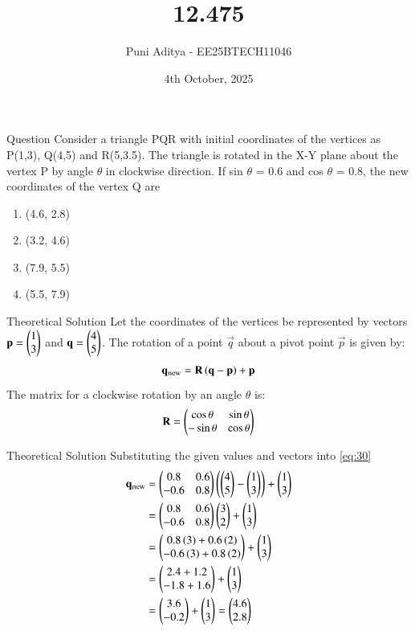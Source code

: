 \documentclass{beamer}
\title{12.475}
\date{4th October, 2025}
\author{Puni Aditya - EE25BTECH11046}
\begin{document}
\frame{\titlepage}
\begin{frame}{Question}
Consider a triangle PQR with initial coordinates of the vertices as P(1,3), Q(4,5) and R(5,3.5). The triangle is rotated in the X-Y plane about the vertex P by angle $\theta$ in clockwise direction. If sin $\theta$ = 0.6 and cos $\theta$ = 0.8, the new coordinates of the vertex Q are
\begin{enumerate}
    \item (4.6, 2.8)
    \item (3.2, 4.6)
    \item (7.9, 5.5)
    \item (5.5, 7.9)
\end{enumerate}
\end{frame}

\begin{frame}{Theoretical Solution}
Let the coordinates of the vertices be represented by vectors $\mathbf{p} = \begin{pmatrix}1 \\ 3\end{pmatrix}$ and $\mathbf{q} = \begin{pmatrix}4 \\ 5\end{pmatrix}$.
The rotation of a point $\vec{q}$ about a pivot point $\vec{p}$ is given by:
\begin{align}
    \mathbf{q}_{\text{new}} = \mathbf{R}\left(\mathbf{q} - \mathbf{p}\right) + \mathbf{p} \label{eq:30}
\end{align}
The matrix for a clockwise rotation by an angle $\theta$ is:
\begin{align}
    \mathbf{R} = \begin{pmatrix}\cos\theta & \sin\theta \\ -\sin\theta & \cos\theta\end{pmatrix}
\end{align}
\end{frame}

\begin{frame}{Theoretical Solution}
Substituting the given values and vectors into \eqref{eq:30}
\begin{align}
    \mathbf{q}_{\text{new}} &= \begin{pmatrix}0.8 & 0.6 \\ -0.6 & 0.8\end{pmatrix}\left(\begin{pmatrix}4 \\ 5\end{pmatrix} - \begin{pmatrix}1 \\ 3\end{pmatrix}\right) + \begin{pmatrix}1 \\ 3\end{pmatrix}  \\
    &= \begin{pmatrix}0.8 & 0.6 \\ -0.6 & 0.8\end{pmatrix}\begin{pmatrix}3 \\ 2\end{pmatrix} + \begin{pmatrix}1 \\ 3\end{pmatrix}  \\
    &= \begin{pmatrix}0.8\left(3\right) + 0.6\left(2\right) \\ -0.6\left(3\right) + 0.8\left(2\right)\end{pmatrix} + \begin{pmatrix}1 \\ 3\end{pmatrix}  \\
    &= \begin{pmatrix}2.4 + 1.2 \\ -1.8 + 1.6\end{pmatrix} + \begin{pmatrix}1 \\ 3\end{pmatrix}  \\
    &= \begin{pmatrix}3.6 \\ -0.2\end{pmatrix} + \begin{pmatrix}1 \\ 3\end{pmatrix} = \begin{pmatrix}4.6 \\ 2.8\end{pmatrix}
\end{align}
\end{frame}
\end{document}
